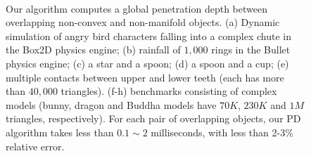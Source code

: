 \begin{figure}
{  \\
}
\caption[Learning-based PD computation algorithm computes a global penetration depth between overlapping non-convex and non-manifold objects]{Our algorithm computes a global penetration depth between overlapping non-convex and non-manifold objects. (a) Dynamic simulation of angry bird characters falling into a complex chute in the Box2D physics engine; (b) rainfall of $1,000$ rings in the Bullet physics engine; (c) a star and a spoon; (d) a spoon and a cup; (e) multiple contacts between upper and lower teeth (each has more than $40,000$ triangles). (f-h) benchmarks consisting of complex models (bunny, dragon and Buddha models have $70K$, $230K$ and $1M$ triangles, respectively). For each pair of overlapping objects, our PD algorithm takes less than $0.1\sim2$ milliseconds, with less than 2-3\% relative error.}\label{fig:2:demo}
\end{figure}


